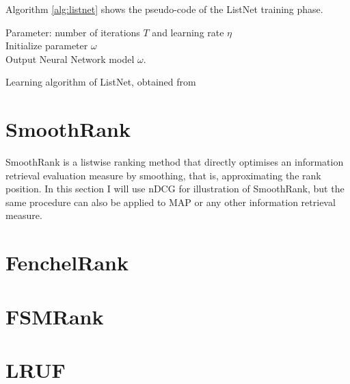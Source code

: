 \noindent Algorithm \ref{alg:listnet} shows the pseudo-code of the ListNet training phase.\\

\begin{algorithm}[H]
 Parameter: number of iterations $T$ and learning rate $\eta$\\
 Initialize parameter $\omega$\\
 Output Neural Network model $\omega$.
 \caption{Learning algorithm of ListNet, obtained from \cite{Cao2007}}
 \label{alg:listnet}
\end{algorithm}

\section{SmoothRank}
SmoothRank \cite{Chapelle2010} is a listwise ranking method that directly optimises an information retrieval evaluation measure by smoothing, that is, approximating the rank position. In this section I will use \ac{nDCG} for illustration of SmoothRank, but the same procedure can also be applied to \ac{MAP} or any other information retrieval measure. 

\section{FenchelRank}

\section{FSMRank}

\section{LRUF}